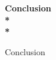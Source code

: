 \begin{center}

    \bf{{\LARGE Conclusion}}\\*~\\*
    
    
    
    
    
    \end{center}
    
    Conclusion